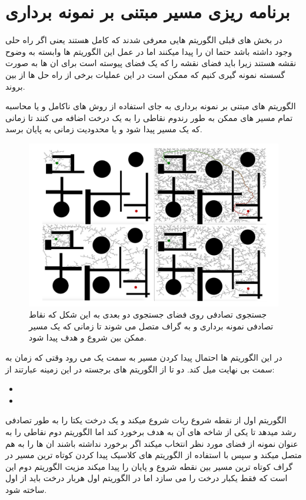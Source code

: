 \section{برنامه ریزی مسیر مبتنی بر نمونه برداری}
در بخش های قبلی الگوریتم هایی معرفی شدند که کامل هستند یعنی اگر راه حلی وجود داشته باشد حتما ان را پیدا میکنند اما در عمل این الگوریتم ها وابسته به وضوح نقشه هستند زیرا باید فضای نقشه را که یک فضای پیوسته است برای ان ها به صورت گسسته نمونه گیری کنیم که ممکن است در این عملیات برخی از راه حل ها از بین بروند.

الگوریتم های مبتنی بر نمونه برداری به جای استفاده از روش های ناکامل و یا محاسبه تمام مسیر های ممکن به طور رندوم نقاطی را به یک درخت اضافه می کنند تا زمانی که یک مسیر  پیدا شود و یا محدودیت زمانی به پایان برسد.

\begin{figure}[H]
  \includegraphics[width = \textwidth]{images/sample.png}
  \caption{
  جستجوی تصادفی روی فضای جستجوی دو بعدی به این شکل که نقاط تصادفی نمونه برداری و به گراف متصل می شوند تا زمانی که یک مسیر ممکن بین شروع و هدف پیدا شود. 
  }
  \label{fig:sample}
\end{figure}
در این الگوریتم ها احتمال پیدا کردن مسیر به سمت یک می رود وقتی که زمان به سمت بی نهایت میل کند.
دو تا از الگوریتم های برجسته در این زمینه عبارتند از:
\begin{itemize}
    \item {}
    \item {}
\end{itemize}

الگوریتم اول از نقطه شروع ربات شروع میکند و یک درخت یکتا را به طور تصادفی رشد میدهد تا یکی از شاخه های آن به هدف برخورد کند اما الگوریتم دوم نقاطی را به عنوان نمونه از فضای مورد نظر انتخاب میکند اگر برخورد نداشته باشند ان ها را به هم متصل میکند و سپس با استفاده از الگوریتم های کلاسیک پیدا کردن کوتاه ترین مسیر در گراف کوتاه ترین مسیر بین نقطه شروع و پایان را پیدا میکند مزیت الگوریتم دوم این است که فقط یکبار درخت را می سازد اما در الگوریتم اول هربار درخت باید از اول ساخته شود.

